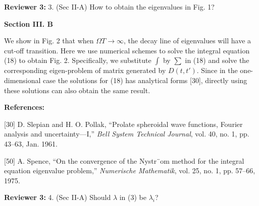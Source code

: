 \documentclass[a4paper,12pt]{article}
\begin{document}
\textbf{Reviewer 3:} 3. (Sec II-A) How to obtain the eigenvalues in Fig. 1?

{}

\begin{framed}
	{\bf Section III. B}

    We show in Fig. 2 that when $\Omega T \rightarrow \infty$, the decay line of eigenvalues will have a cut-off transition. {\color{red} Here we use numerical schemes to solve the integral equation (18) to obtain Fig. 2. Specifically, we substitute $\int$ by $\sum$ in (18) and solve the corresponding eigen-problem of matrix generated by $D(t,t')$. Since in the one-dimensional case the solutions for (18) has analytical forms [30], directly using these solutions can also obtain the same result.}
\end{framed}

{\color{blue}
	{\bf References:}
	
	[30] D. Slepian and H. O. Pollak, “Prolate spheroidal wave functions, Fourier analysis and uncertainty—I,” {\it Bell System Technical
	Journal}, vol. 40, no. 1, pp. 43–63, Jan. 1961.
	
	[50] A. Spence, “On the convergence of the Nystr¨om method for the integral equation eigenvalue problem,” {\it Numerische Mathematik},
	vol. 25, no. 1, pp. 57–66, 1975.
	
	
}

\textbf{Reviewer 3:} 4. (Sec II-A) Should $\lambda$ in (3) be $\lambda_i$?

{}
\end{document}
